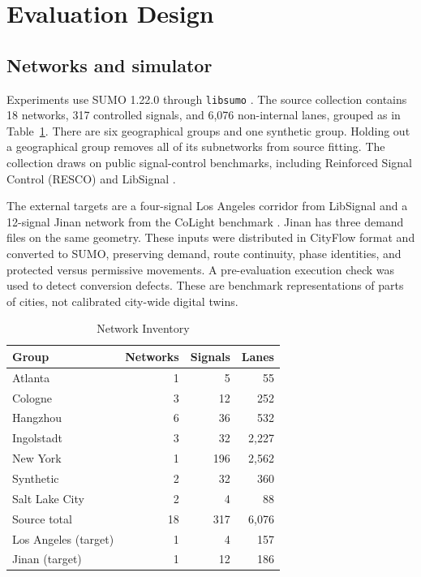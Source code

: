 \section{Evaluation Design}
\subsection{Networks and simulator}
Experiments use SUMO 1.22.0 through \texttt{libsumo} \cite{lopez2018microscopic}. The source collection contains 18 networks, 317 controlled signals, and 6,076 non-internal lanes, grouped as in Table~\ref{tab:networks}. There are six geographical groups and one synthetic group. Holding out a geographical group removes all of its subnetworks from source fitting. The collection draws on public signal-control benchmarks, including Reinforced Signal Control (RESCO) and LibSignal \cite{ault2021reinforcement,mei2022libsignal}.

The external targets are a four-signal Los Angeles corridor from LibSignal and a 12-signal Jinan network from the CoLight benchmark \cite{wei2019colight}. Jinan has three demand files on the same geometry. These inputs were distributed in CityFlow format \cite{zhang2019cityflow} and converted to SUMO, preserving demand, route continuity, phase identities, and protected versus permissive movements. A pre-evaluation execution check was used to detect conversion defects. These are benchmark representations of parts of cities, not calibrated city-wide digital twins.

\begin{table}[!t]
\caption{Network Inventory}
\label{tab:networks}
\centering
\begin{tabular}{lrrr}
\toprule
Group & Networks & Signals & Lanes\\
\midrule
Atlanta & 1 & 5 & 55\\
Cologne & 3 & 12 & 252\\
Hangzhou & 6 & 36 & 532\\
Ingolstadt & 3 & 32 & 2,227\\
New York & 1 & 196 & 2,562\\
Synthetic & 2 & 32 & 360\\
Salt Lake City & 2 & 4 & 88\\
\midrule
Source total & 18 & 317 & 6,076\\
\midrule
Los Angeles (target) & 1 & 4 & 157\\
Jinan (target) & 1 & 12 & 186\\
\bottomrule
\end{tabular}
\end{table}

